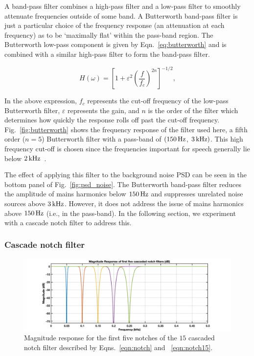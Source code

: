 \documentclass[paper-main.tex]{subfiles}
\begin{document}
A band-pass filter combines a high-pass filter and a low-pass filter to smoothly attenuate frequencies outside of some band. A Butterworth band-pass filter is just a particular choice of the frequency response (an attenuation at each frequency) as to be `maximally flat' within the pass-band region. The Butterworth low-pass component is given by Eqn.~\ref{eq:butterworth} and is combined with a similar high-pass filter to form the band-pass filter.

\begin{equation}
\label{eq:butterworth}
H(\omega) = \left[1+\varepsilon^2 \left( \frac{f}{f_c} \right)^{2n}\right]^{-1/2},
\end{equation}

In the above expression, $f_c$ represents the cut-off frequency of the low-pass Butterworth filter, $\varepsilon$ represents the gain, and $n$ is the order of the filter which determines how quickly the response rolls off past the cut-off frequency. Fig.~\ref{fig:butterworth} shows the frequency response of the filter used here, a fifth order ($n = 5$) Butterworth filter with a pass-band of $(150\,{\rm Hz}$, $3\,{\rm kHz})$. This high frequency cut-off is chosen since the frequencies important for speech generally lie below $2\,{\rm kHz}$~\cite{speech_intelligibility}.

The effect of applying this filter to the background noise PSD can be seen in the bottom panel of Fig.~\ref{fig:psd_noise}. The Butterworth band-pass filter reduces the amplitude of mains harmonics below $150\,{\rm Hz}$ and suppresses unrelated noise sources above $3\,{\rm kHz}$. However, it does not address the issue of mains harmonics above $150\,{\rm Hz}$ (i.e., in the pass-band). In the following section, we experiment with a cascade notch filter to address this.



\subsubsection{Cascade notch filter}
\begin{figure}
\begin{center}
\includegraphics[width=.9\textwidth]{figures/notch_filter_response}
\end{center}
\caption{\label{fig:notchMagResponse}
Magnitude response for the first five notches of the $15$ cascaded notch filter described by Eqns.~\ref{eqn:notch} and ~\ref{eqn:notch15}. 
}
\end{figure}
\end{document}
